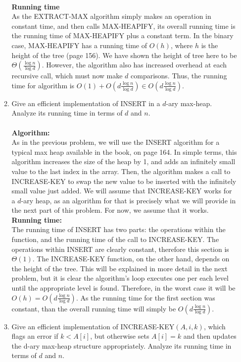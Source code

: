\documentclass{article}
\begin{document}
\begin{enumerate}
\begin{enumerate}
\\ \textbf{Running time}
\\ As the EXTRACT-MAX algorithm simply makes an operation in constant time, and then calls MAX-HEAPIFY, its overall running time is the running time of MAX-HEAPIFY plus a constant term. In the binary case, MAX-HEAPIFY has a running time of $O(h)$, where $h$ is the height of the tree (page 156). We have shown the height of tree here to be $\Theta(\frac{\log n}{\log d})$. However, the algorithm also has increased overhead at each recursive call, which must now make $d$ comparisons. Thus, the running time for algorithm is $O(1)+O(d\frac{\log n}{\log d})\in O(d\frac{\log n}{\log d})$.
		\item Give an efficient implementation of INSERT in a $d$-ary max-heap. Analyze its running time in terms of $d$ and $n$.
\\\\ \textbf{Algorithm:}
\\ As in the previous problem, we will use the INSERT algorithm for a typical max heap available in the book, on page 164. In simple terms, this algorithm increases the size of the heap by 1, and adds an infinitely small value to the last index in the array. Then, the algorithm makes a call to INCREASE-KEY to swap the new value to be inserted with the infinitely small value just added. We will assume that INCREASE-KEY works for a $d$-ary heap, as an algorithm for that is precisely what we will provide in the next part of this problem. For now, we assume that it works.
\\ \textbf{Running time:}
\\ The running time of INSERT has two parts: the operations within the function, and the running time of the call to INCREASE-KEY. The operations within INSERT are clearly constant, therefore this section is $\Theta(1)$. The INCREASE-KEY function, on the other hand, depends on the height of the tree. This will be explained in more detail in the next problem, but it is clear the algorithm's loop executes one per each level until the appropriate level is found. Therefore, in the worst case it will be $O(h)=O(d\frac{\log n}{\log d})$. As the running time for the first section was constant, than the overall running time will simply be $O(d\frac{\log n}{\log d})$.		
\item Give an efficient implementation of INCREASE-KEY$(A,i,k)$, which flags an error if $k<A[i]$, but otherwise sets $A[i]=k$ and then updates the d-ary max-heap structure appropriately. Analyze its running time in terms of $d$ and $n$.

\end{enumerate}
\end{enumerate}
\end{document}
